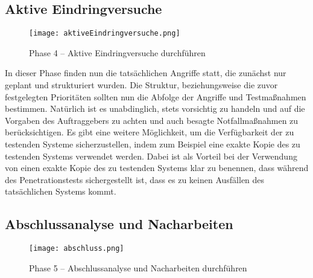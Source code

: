 \newpage

\subsection{Aktive Eindringversuche}

\begin{figure}[h]
	\centering
	\texttt{[image: aktiveEindringversuche.png]}
	\caption{Phase 4 – Aktive Eindringversuche durchführen}
\end{figure}

In dieser Phase finden nun die tatsächlichen Angriffe statt, die zunächst nur geplant und strukturiert wurden. Die Struktur, beziehungsweise die zuvor festgelegten Prioritäten sollten nun die Abfolge der Angriffe und Testmaßnahmen bestimmen. Natürlich ist es unabdinglich, stets vorsichtig zu handeln und auf die Vorgaben des Auftraggebers zu achten und auch besagte Notfallmaßnahmen zu berücksichtigen. Es gibt eine weitere Möglichkeit, um die Verfügbarkeit der zu testenden Systeme sicherzustellen, indem zum Beispiel eine exakte Kopie des zu testenden Systems verwendet werden. Dabei ist als Vorteil bei der Verwendung von einen exakte Kopie des zu testenden Systems klar zu benennen, dass während des Penetrationstests sichergestellt ist, dass es zu keinen Ausfällen des tatsächlichen Systems kommt\cite[104--105]{pt03bsi}.

\subsection{Abschlussanalyse und Nacharbeiten}

\begin{figure}[h]
	\centering
	\texttt{[image: abschluss.png]}
	\caption{Phase 5 – Abschlussanalyse und Nacharbeiten durchführen}
\end{figure}

